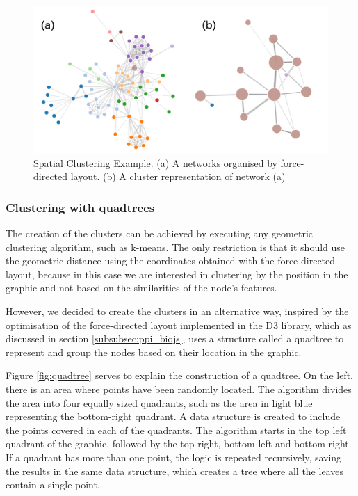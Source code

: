 \begin{figure}[ht]
\centering
\includegraphics[width=\textwidth]{figures/spatial_clustring.png}
\caption[Spatial Clustering Example.]{Spatial Clustering Example. (a) A networks organised by force-directed layout. (b) A cluster representation of network (a)
\label{fig:spatial_clustring}}
\end{figure}

\subsubsection{Clustering with quadtrees}
The creation of the clusters can be achieved by executing any geometric clustering algorithm, such as k-means. The only restriction is that it should use the geometric distance using the coordinates obtained with the force-directed layout, because in this case we are interested in clustering by the position in the graphic and not based on the similarities of the node's features.

However, we decided to create the clusters in an alternative way, inspired by the optimisation of the force-directed layout implemented in the D3 library, which as discussed in section \ref{subsubsec:ppi_biojs}, uses a structure called a quadtree to represent and group the nodes based on their location in the graphic.
 
Figure \ref{fig:quadtree} serves to explain the construction of a quadtree. On the left, there is an area where points have been randomly located. The algorithm divides the area into four equally sized quadrants, such as the area in light blue representing the bottom-right quadrant. A data structure is created to include the points covered in each of the quadrants. The algorithm starts in the top left quadrant of the graphic, followed by the top right, bottom left and bottom right. If a quadrant has more than one point, the logic is repeated recursively, saving the results in the same data structure, which creates a tree where all the leaves contain a single point. 

